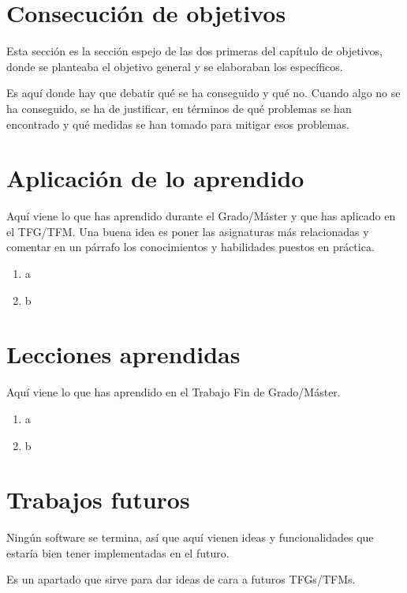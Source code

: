 \documentclass[a4paper, 12pt, english]{book}
\begin{document}
\section{Consecución de objetivos}
\label{sec:consecucion-objetivos}

Esta sección es la sección espejo de las dos primeras del capítulo de objetivos, donde se planteaba el objetivo general y se elaboraban los específicos.

Es aquí donde hay que debatir qué se ha conseguido y qué no.
Cuando algo no se ha conseguido, se ha de justificar, en términos de qué problemas se han encontrado y qué medidas se han tomado para mitigar esos problemas.


\section{Aplicación de lo aprendido}
\label{sec:aplicacion}

Aquí viene lo que has aprendido durante el Grado/Máster y que has aplicado en el TFG/TFM. Una buena idea es poner las asignaturas más relacionadas y comentar en un párrafo los conocimientos y habilidades puestos en práctica.

\begin{enumerate}
  \item a
  \item b
\end{enumerate}


\section{Lecciones aprendidas}
\label{sec:lecciones_aprendidas}

Aquí viene lo que has aprendido en el Trabajo Fin de Grado/Máster.

\begin{enumerate}
  \item a
  \item b
\end{enumerate}


\section{Trabajos futuros}
\label{sec:trabajos_futuros}

Ningún software se termina, así que aquí vienen ideas y funcionalidades que estaría bien tener implementadas en el futuro.

Es un apartado que sirve para dar ideas de cara a futuros TFGs/TFMs.
\end{document}
